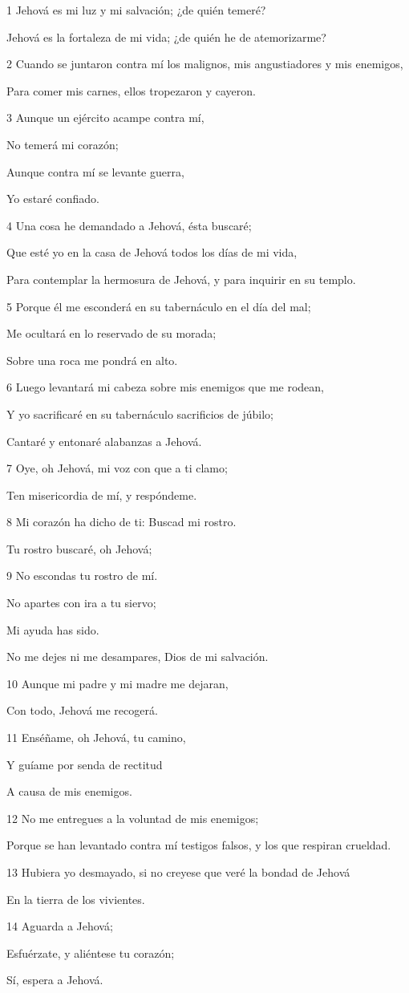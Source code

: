 \par 1 Jehová es mi luz y mi salvación; ¿de quién temeré?
\par Jehová es la fortaleza de mi vida; ¿de quién he de atemorizarme?
\par 2 Cuando se juntaron contra mí los malignos, mis angustiadores y mis enemigos,
\par Para comer mis carnes, ellos tropezaron y cayeron.
\par 3 Aunque un ejército acampe contra mí,
\par No temerá mi corazón;
\par Aunque contra mí se levante guerra,
\par Yo estaré confiado.
\par 4 Una cosa he demandado a Jehová, ésta buscaré;
\par Que esté yo en la casa de Jehová todos los días de mi vida,
\par Para contemplar la hermosura de Jehová, y para inquirir en su templo.
\par 5 Porque él me esconderá en su tabernáculo en el día del mal;
\par Me ocultará en lo reservado de su morada;
\par Sobre una roca me pondrá en alto.
\par 6 Luego levantará mi cabeza sobre mis enemigos que me rodean,
\par Y yo sacrificaré en su tabernáculo sacrificios de júbilo;
\par Cantaré y entonaré alabanzas a Jehová.
\par 7 Oye, oh Jehová, mi voz con que a ti clamo;
\par Ten misericordia de mí, y respóndeme.
\par 8 Mi corazón ha dicho de ti: Buscad mi rostro.
\par Tu rostro buscaré, oh Jehová;
\par 9 No escondas tu rostro de mí.
\par No apartes con ira a tu siervo;
\par Mi ayuda has sido.
\par No me dejes ni me desampares, Dios de mi salvación.
\par 10 Aunque mi padre y mi madre me dejaran,
\par Con todo, Jehová me recogerá.
\par 11 Enséñame, oh Jehová, tu camino,
\par Y guíame por senda de rectitud
\par A causa de mis enemigos.
\par 12 No me entregues a la voluntad de mis enemigos;
\par Porque se han levantado contra mí testigos falsos, y los que respiran crueldad.
\par 13 Hubiera yo desmayado, si no creyese que veré la bondad de Jehová
\par En la tierra de los vivientes.
\par 14 Aguarda a Jehová;
\par Esfuérzate, y aliéntese tu corazón;
\par Sí, espera a Jehová.

